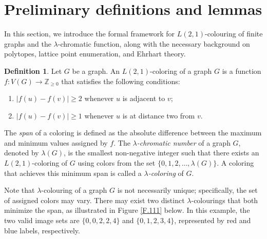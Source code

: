 \documentclass{birkjour}
\theoremstyle{definition}
\newtheorem{definition}[theorem]{Definition}
\theoremstyle{remark}
\numberwithin{equation}{section}
\begin{document}
\section{Preliminary  definitions and  lemmas}
In this section, we introduce the formal framework for $L(2,1)$-colouring of finite graphs and the $\lambda$-chromatic function, along with the necessary background on polytopes, lattice point enumeration, and Ehrhart theory.
\begin{definition}
Let $G$ be a graph. An $L(2,1)$-coloring of a graph $G$ is a function $f:V(G) \longrightarrow \mathbb{Z}_{\geq0}$ that satisfies the following conditions:
\begin{enumerate}[label=(\alph*)]
\item $|f(u)-f(v)| \geq 2$ whenever $u$ is adjacent to $v$;
\item $|f(u)-f(v)| \geq 1$ whenever $u$ is at distance two from $v$.
\end{enumerate}
The \textit{span} of a coloring is defined as the absolute difference between the maximum and minimum values assigned by \( f \). The \textit{\( \lambda \)-chromatic number} of a graph \( G \), denoted by \( \lambda(G) \), is the smallest non-negative integer such that there exists an \( L(2,1) \)-coloring of \( G \) using colors from the set \( \{0, 1, 2, \dots, \lambda(G)\} \). A coloring that achieves this minimum span is called a \textit{\( \lambda \)-coloring} of \( G \).
\end{definition}

\noindent
Note that $\lambda$-colouring of a graph \( G \) is not necessarily unique; specifically, the set of assigned colors may vary. There may exist two distinct \(\lambda \)-colourings that both minimize the span, as illustrated in  Figure \ref{F.111} below. In this example, the two valid image sets are \( \{0,0,2,2,4\} \) and \( \{0,1,2,3,4\} \), represented by red and blue labels, respectively.\\
\end{document}
